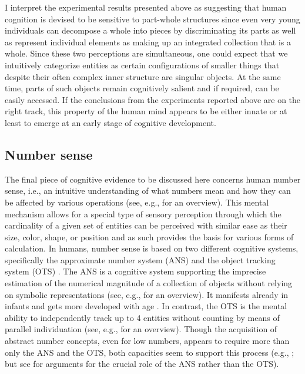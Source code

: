 I interpret the experimental results presented above as suggesting that human cognition is devised to be sensitive to part-whole structures since even very young individuals can decompose a whole into pieces by discriminating its parts as well as represent individual elements as making up an integrated collection that is a whole. Since these two perceptions are simultaneous, one could expect that we intuitively categorize entities as certain configurations of smaller things that despite their often complex inner structure are singular objects. At the same time, parts of such objects remain cognitively salient and if required, can be easily accessed. If the conclusions from the experiments reported above are on the right track, this property of the human mind appears to be either innate or at least to emerge at an early stage of cognitive development.

\subsection{Number sense}\label{sec:number-sense}

The final piece of cognitive evidence to be discussed here concerns human number sense, i.e., an intuitive understanding of what numbers mean and how they can be affected by various operations (see, e.g., \citealt{dehaene1997number} for an overview). This mental mechanism allows for a special type of sensory perception through which the cardinality of a given set of entities can be perceived with similar ease as their size, color, shape, or position and as such provides the basis for various forms of calculation. In humans, number sense is based on two different cognitive systems, specifically the approximate number system (ANS) and the object tracking system (OTS) \citep[see, e.g.,][]{hyde2011two}. The ANS is a cognitive system supporting the imprecise estimation of the numerical magnitude of a collection of objects without relying on symbolic representations (see, e.g., \citealt{feigenson_et-al2004core,nieder_dehaene2009representation} for an overview). It manifests already in infants and gets more developed with age \citep{cantlon_et-al2006functional}. In contrast, the OTS is the mental ability to independently track up to 4 entities without counting by means of parallel individuation (see, e.g., \citealt{carey1998knowledge,carey2009origin} for an overview). Though the acquisition of abstract number concepts, even for low numbers, appears to require more than only the ANS and the OTS, both capacities seem to support this process (e.g., \citealt{hyde2011two}; but see \citealt{piazza2010neurocognitive} for arguments for the crucial role of the ANS rather than the OTS).

